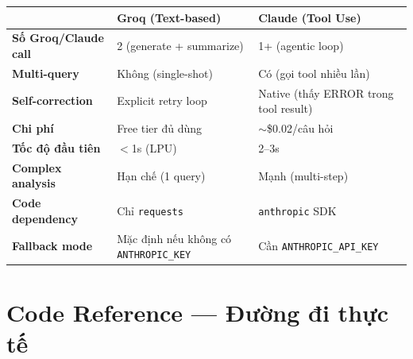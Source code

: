 \documentclass[12pt, a4paper]{article}
\begin{document}
\begin{tcolorbox}[colback=gray!5, colframe=gray!40, arc=6pt,
  title={\faSitemap\ So sánh hai chế độ: Groq (Text-based) vs Claude (Tool Use)}]
\begin{center}
\end{center}

\vspace{0.5em}
\renewcommand{\arraystretch}{1.5}
\begin{tabularx}{\textwidth}{>{\bfseries}p{3.5cm}XX}
\toprule
 & \textcolor{groqgreen}{\bfseries Groq (Text-based)} & \textcolor{blue!70}{\bfseries Claude (Tool Use)} \\
\midrule
Số Groq/Claude call & 2 (generate + summarize) & 1+ (agentic loop) \\
Multi-query & Không (single-shot) & Có (gọi tool nhiều lần) \\
Self-correction & Explicit retry loop & Native (thấy ERROR trong tool result) \\
Chi phí & Free tier đủ dùng & $\sim$\$0.02/câu hỏi \\
Tốc độ đầu tiên & $<$1s (LPU) & 2--3s \\
Complex analysis & Hạn chế (1 query) & Mạnh (multi-step) \\
Code dependency & Chỉ \texttt{requests} & \texttt{anthropic} SDK \\
Fallback mode & Mặc định nếu không có \texttt{ANTHROPIC\_KEY} & Cần \texttt{ANTHROPIC\_API\_KEY} \\
\bottomrule
\end{tabularx}

\end{tcolorbox}

\newpage

\section{Code Reference — Đường đi thực tế}
\end{document}
